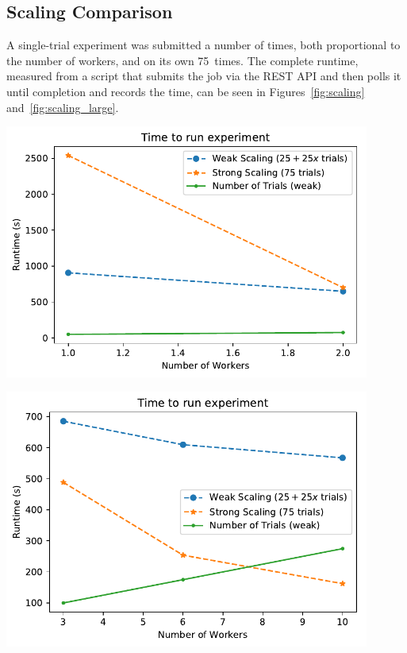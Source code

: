 \documentclass[a4paper]{IEEEtran}
\begin{document}
\subsection{Scaling Comparison}

A single-trial experiment was submitted a number of times, both proportional to
the number of workers, and on its own 75~times. The complete runtime, measured
from a script that submits the job via the REST API and then polls it until
completion and records the time, can be seen in Figures~\ref{fig:scaling} and~\ref{fig:scaling_large}.
\begin{Figure}
  \centering \includegraphics[width=0.9\textwidth]{scaling_graph}
  \label{fig:scaling}
\end{Figure}

\begin{Figure}
  \centering \includegraphics[width=0.9\textwidth]{scaling_graph_large}
  \label{fig:scaling_large}
\end{Figure}
\end{document}
